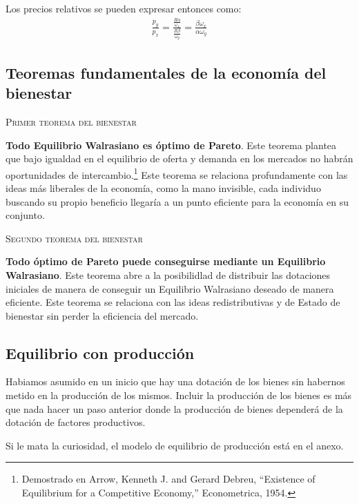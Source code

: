 Los precios relativos se pueden expresar entonces como:
\begin{align*}
    \frac{p_y}{p_x} = \frac{ \frac{R\alpha}{\omega_x}  }{  \frac{R\beta}{\omega_y}  } = \frac{\beta \omega_x}{\alpha \omega_y}
\end{align*} 

\subsection{Teoremas fundamentales de la economía del bienestar}

\textsc{Primer teorema del bienestar} 

\textbf{Todo Equilibrio Walrasiano es óptimo de Pareto}. Este teorema plantea que bajo igualdad en el equilibrio de oferta y demanda en los mercados no habrán oportunidades de intercambio.\footnote{Demostrado en Arrow, Kenneth J. and Gerard Debreu, “Existence of Equilibrium for a Competitive Economy,” Econometrica, 1954.} Este teorema se relaciona profundamente con las ideas más liberales de la economía, como la mano invisible, cada individuo buscando su propio beneficio llegaría a un punto eficiente para la economía en su conjunto. 

\textsc{Segundo teorema del bienestar} 

\textbf{Todo óptimo de Pareto puede conseguirse mediante un Equilibrio Walrasiano}. Este teorema abre a la posibilidlad de distribuir las dotaciones iniciales de manera de conseguir un Equilibrio Walrasiano deseado de manera eficiente. Este teorema se relaciona con las ideas redistributivas y de Estado de bienestar sin perder la eficiencia del mercado. 

\subsection{Equilibrio con producción}

Habiamos asumido en un inicio que hay una dotación de los bienes sin habernos metido en la producción de los mismos. Incluir la producción de los bienes es más que nada hacer un paso anterior donde la producción de bienes dependerá de la dotación de factores productivos.

Si le mata la curiosidad, el modelo de equilibrio de producción está en el anexo.

